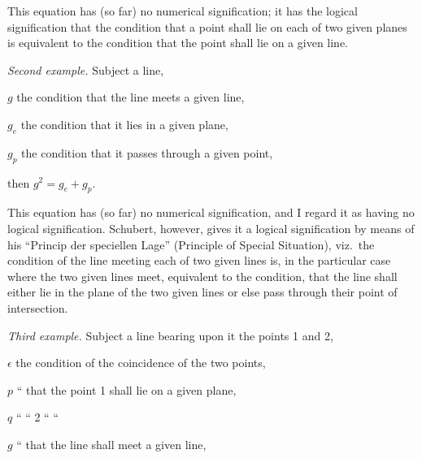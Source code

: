 \documentclass[11pt,a4paper]{book}
\begin{document}
This equation has (so far) no numerical signification; it has the logical signification that the condition that a point shall lie on each of two given planes is equivalent to the condition that the point shall lie on a given line.

\textit{Second example.} Subject a line,

\hspace*{2em} $g$ the condition that the line meets a given line,

\hspace*{2em} $g_e$ the condition that it lies in a given plane,

\hspace*{2em} $g_p$ the condition that it passes through a given point,

\hspace*{2em} then $g^2 = g_e + g_p$.

This equation has (so far) no numerical signification, and I regard it as having no logical signification. Schubert, however, gives it a logical signification by means of his ``Princip der speciellen Lage'' (Principle of Special Situation), viz.\ the condition of the line meeting each of two given lines is, in the particular case where the two given lines meet, equivalent to the condition, that the line shall either lie in the plane of the two given lines or else pass through their point of intersection.

\newpage
\textit{Third example.} Subject a line bearing upon it the points 1 and 2,

\hspace*{2em} $\epsilon$ the condition of the coincidence of the two points,

\hspace*{2em} $p$ \hspace{1.5em} `` \hspace{1.5em} that the point 1 shall lie on a given plane,

\hspace*{2em} $q$ \hspace{1.5em} `` \hspace{1.5em} \hspace{1.5em} `` \hspace{1.5em} 2 \hspace{1.5em} `` \hspace{1.5em} ``

\hspace*{2em} $g$ \hspace{1.5em} `` \hspace{1.5em} that the line shall meet a given line,
\end{document}
